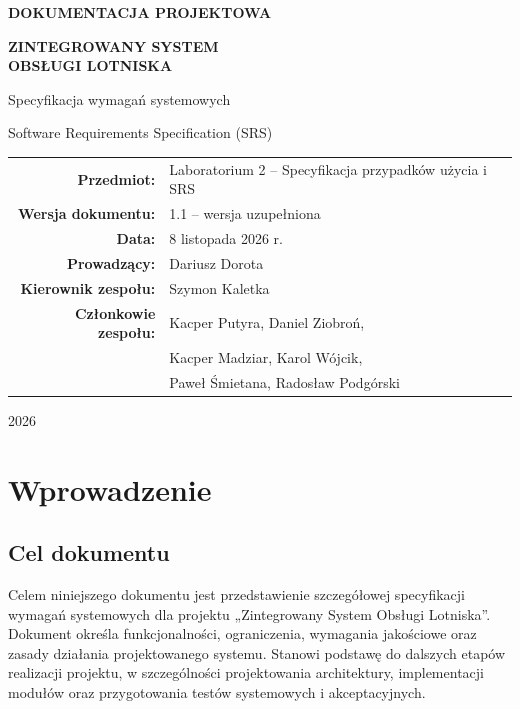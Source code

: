 \documentclass[12pt,a4paper,oneside]{report}
\begin{document}
\begin{titlepage}
    \centering
    \vspace*{1.5cm}
    {\Large \textbf{DOKUMENTACJA PROJEKTOWA}\par}
    \vspace{2.0cm}
    {\Huge\bfseries\color{navy} ZINTEGROWANY SYSTEM\\[0.3cm] OBSŁUGI LOTNISKA\par}
    \vspace{1.0cm}
    {\LARGE Specyfikacja wymagań systemowych\par}
    \vspace{0.4cm}
    {\large Software Requirements Specification (SRS)\par}
    \vfill
    \begin{tabular}{rl}
        \textbf{Przedmiot:} & Laboratorium 2 -- Specyfikacja przypadków użycia i SRS\\
        \textbf{Wersja dokumentu:} & 1.1 -- wersja uzupełniona\\
        \textbf{Data:} & 8 listopada 2026 r.\\
        \textbf{Prowadzący:} & Dariusz Dorota\\
        \textbf{Kierownik zespołu:} & Szymon Kaletka\\
        \textbf{Członkowie zespołu:} & Kacper Putyra, Daniel Ziobroń,\\
        & Kacper Madziar, Karol Wójcik,\\
        & Paweł Śmietana, Radosław Podgórski\\
    \end{tabular}
    \vfill
    {\large 2026\par}
\end{titlepage}

\tableofcontents
\listoftables
\clearpage
{}

\chapter{Wprowadzenie}

\section{Cel dokumentu}
Celem niniejszego dokumentu jest przedstawienie szczegółowej specyfikacji wymagań systemowych dla projektu „Zintegrowany System Obsługi Lotniska”. Dokument określa funkcjonalności, ograniczenia, wymagania jakościowe oraz zasady działania projektowanego systemu. Stanowi podstawę do dalszych etapów realizacji projektu, w szczególności projektowania architektury, implementacji modułów oraz przygotowania testów systemowych i akceptacyjnych.
\end{document}
